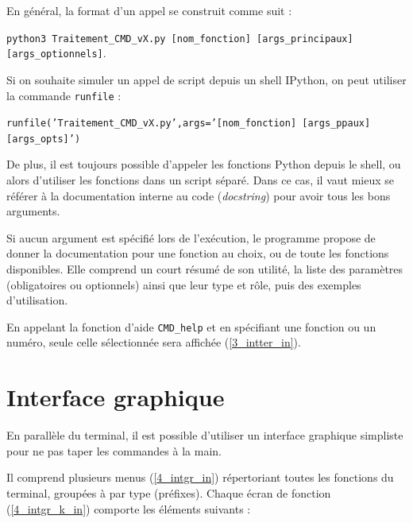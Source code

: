 \documentclass[12pt]{article}
\begin{document}
    En général, la format d'un appel se construit comme suit :
    
    \texttt{python3 Traitement\_CMD\_vX.py [nom\_fonction] [args\_principaux] [args\_optionnels]}.

    Si on souhaite simuler un appel de script depuis un shell IPython, on peut utiliser la commande \texttt{runfile} :
    
    \texttt{runfile('Traitement\_CMD\_vX.py',args='[nom\_fonction] [args\_ppaux] [args\_opts]')}

    De plus, il est toujours possible d'appeler les fonctions Python depuis le shell, ou alors d'utiliser les fonctions dans un script séparé. Dans ce cas, il vaut mieux se référer à la documentation interne au code (\textit{docstring}) pour avoir tous les bons arguments.
    
    Si aucun argument est spécifié lors de l'exécution, le programme propose de donner la documentation pour une fonction au choix, ou de toute les fonctions disponibles. Elle comprend un court résumé de son utilité, la liste des paramètres (obligatoires ou optionnels) ainsi que leur type et rôle, puis des exemples d'utilisation.

    \label{3_intter_out} En appelant la fonction d'aide \texttt{CMD\_help} et en spécifiant une fonction ou un numéro, seule celle sélectionnée sera affichée (\ref{3_intter_in}).

\newpage
\section{Interface graphique}

    En parallèle du terminal, il est possible d'utiliser un interface graphique simpliste pour ne pas taper les commandes à la main.

    \label{4_intgr_out} \label{4_intgr_k_out} Il comprend plusieurs menus (\ref{4_intgr_in}) répertoriant toutes les fonctions du terminal, groupées à par type (préfixes). Chaque écran de fonction (\ref{4_intgr_k_in}) comporte les éléments suivants :
\end{document}
